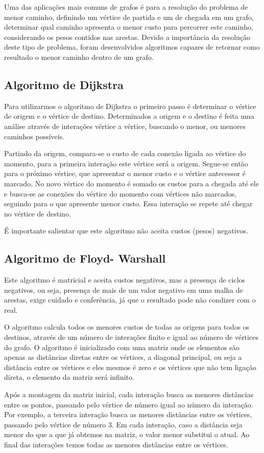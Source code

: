 Uma das aplicações mais comuns de grafos é para a resolução do problema de menor caminho, definindo um vértice de partida e um de chegada em um grafo, determinar qual caminho apresenta o menor custo para percorrer este caminho, considerando os pesos contidos nas arestas. Devido a importância da resolução deste tipo de problema, foram desenvolvidos algoritmos capazes de retornar como resultado o menor caminho dentro de um grafo.

\subsection{Algoritmo de Dijkstra}

Para utilizarmos o algoritmo de Dijkstra o primeiro passo é determinar o vértice de origem e o vértice de destino. Determinados a origem e o destino é feita uma análise através de interações vértice a vértice, buscando o menor, ou menores caminhos possíveis.

Partindo da origem, compara-se o custo de cada conexão ligada ao vértice do momento, para a primeira interação este vértice será a origem. Segue-se então para o próximo vértice, que apresentar o menor custo e o vértice antecessor é marcado. No novo vértice do momento é somado os custos para a chegada até ele e busca-se as conexões do vértice do momento com vértices não marcados, seguindo para o que apresente menor custo. Essa interação se repete até chegar no vértice de destino.

É importante salientar que este algoritmo não aceita custos (pesos) negativos.

\subsection{Algoritmo de Floyd- Warshall}

Este algoritmo é matricial e aceita custos negativos, mas a presença de ciclos negativos, ou seja, presença de mais de um valor negativo em uma malha de arestas, exige cuidado e conferência, já que o resultado pode não condizer com o real.
	
O algoritmo calcula todos os menores custos de todas as origens para todos os destinos, através de um número de interações finito e igual ao número de vértices do grafo. O algoritmo é inicializado com uma matriz onde os elementos são apenas as distâncias diretas entre os vértices, a diagonal principal, ou seja a distância entre os vértices e eles mesmos é zero e os vértices que não tem ligação direta, o elemento da matriz será infinito.

Após a montagem da matriz inicial, cada interação busca as menores distâncias entre os pontos, passando pelo vértice de número igual ao número da interação. Por exemplo, a terceira interação busca as menores distâncias entre os vértices, passando pelo vértice de número 3. Em cada interação, caso a distância seja menor do que a que já obtemos na matriz, o valor menor substitui o atual. Ao final das interações temos todas as menores distâncias entre os vértices.
